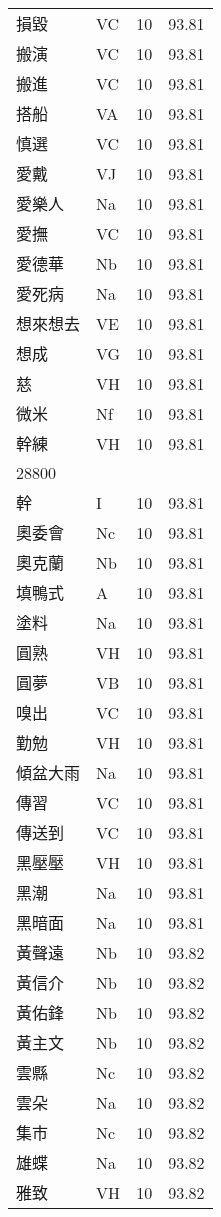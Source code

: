 \documentclass[twocolumn]{book}
\begin{document}
\begin{supertabular}{llrr}
損毀 & VC & 10 &  93.81\\
搬演 & VC & 10 &  93.81\\
搬進 & VC & 10 &  93.81\\
搭船 & VA & 10 &  93.81\\
慎選 & VC & 10 &  93.81\\
愛戴 & VJ & 10 &  93.81\\
愛樂人 & Na & 10 &  93.81\\
愛撫 & VC & 10 &  93.81\\
愛德華 & Nb & 10 &  93.81\\
愛死病 & Na & 10 &  93.81\\
想來想去 & VE & 10 &  93.81\\
想成 & VG & 10 &  93.81\\
慈 & VH & 10 &  93.81\\
微米 & Nf & 10 &  93.81\\
幹練 & VH & 10 &  93.81\\
28800\\
幹 & I & 10 &  93.81\\
奧委會 & Nc & 10 &  93.81\\
奧克蘭 & Nb & 10 &  93.81\\
填鴨式 & A & 10 &  93.81\\
塗料 & Na & 10 &  93.81\\
圓熟 & VH & 10 &  93.81\\
圓夢 & VB & 10 &  93.81\\
嗅出 & VC & 10 &  93.81\\
勤勉 & VH & 10 &  93.81\\
傾盆大雨 & Na & 10 &  93.81\\
傳習 & VC & 10 &  93.81\\
傳送到 & VC & 10 &  93.81\\
黑壓壓 & VH & 10 &  93.81\\
黑潮 & Na & 10 &  93.81\\
黑暗面 & Na & 10 &  93.81\\
黃聲遠 & Nb & 10 &  93.82\\
黃信介 & Nb & 10 &  93.82\\
黃佑鋒 & Nb & 10 &  93.82\\
黃主文 & Nb & 10 &  93.82\\
雲縣 & Nc & 10 &  93.82\\
雲朵 & Na & 10 &  93.82\\
集市 & Nc & 10 &  93.82\\
雄蝶 & Na & 10 &  93.82\\
雅致 & VH & 10 &  93.82\\

\end{supertabular}
\end{document}
